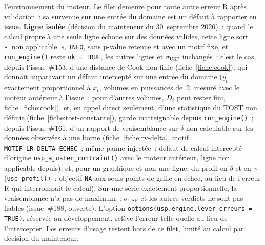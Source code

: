 \documentclass[a4paper,11pt]{article}
\newcommand{\code}[1]{\texttt{\small #1}}
\begin{document}
\begin{itemize}[itemsep=2pt]
  l'environnement du moteur. Le filet demeure pour toute autre erreur R après validation~: sa
  survenue sur une entrée du domaine est un défaut à rapporter en issue. \textbf{Ligne isolée}
  (décision du mainteneur du 30~septembre 2026)~: quand le calcul propre à une seule ligne
  échoue sur des données valides, cette ligne sort «~non applicable~», \code{INFO}, sans p-value
  retenue et avec un motif fixe, et \code{run\_engine()} reste \code{ok = TRUE}, les autres lignes
  et $\sigma_{\mathrm{USP}}$ inchangés~; c'est le cas, depuis l'issue~\#153, d'une distance de
  Cook non finie (fiche~\ref{fiche:cook}), qui donnait auparavant un défaut intercepté
  sur une entrée du domaine ($y_t$ exactement proportionnel à $x_t$, volumes en puissances
  de~2, mesuré avec le moteur antérieur à l'issue~; pour d'autres volumes, $D_t$ peut rester fini,
  fiche~\ref{fiche:cook}), et, en appel direct seulement, d'une statistique du
  TOST non définie (fiche~\ref{fiche:tost-constante}), garde inatteignable depuis
  \code{run\_engine()}~; depuis l'issue~\#161, d'un rapport de vraisemblance sur
  $\delta$ non calculable sur les données observées à une borne (fiche~\ref{fiche:rv-delta},
  motif \code{MOTIF\_LR\_DELTA\_ECHEC}~; même panne injectée~: défaut de calcul intercepté
  d'origine \code{usp\_ajuster\_contraint()} avec le moteur antérieur, ligne non applicable
  depuis), et, pour un graphique et non une ligne, du profil en $\delta$ et en $\gamma$
  (\code{usp\_profil()}~: objectif \code{NA} aux seuls points de grille en échec, au lieu de
  l'erreur R qui interrompait le calcul). Sur une série exactement proportionnelle, la vraisemblance
  n'a pas de maximum~: $\sigma_{\mathrm{USP}}$ et les autres verdicts ne sont pas fiables
  (issue~\#188, ouverte). L'option \code{options(usp.engine.lever\_erreurs = TRUE)}, réservée au
  développement, relève l'erreur telle quelle au lieu de l'intercepter. Les erreurs d'usage
  restent hors de ce filet, limité au calcul par décision du mainteneur.
\end{itemize}
\end{document}
